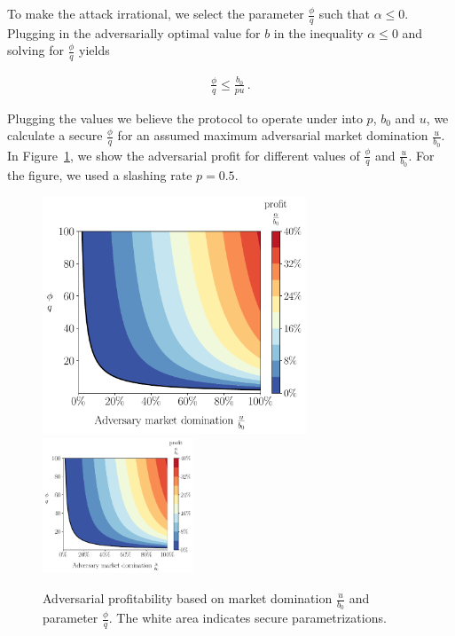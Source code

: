 To make the attack irrational, we select
the parameter $\frac{\phi}{q}$ such that $\alpha \leq 0$.
Plugging in the adversarially optimal value for $b$ in the inequality $\alpha \leq 0$ and solving
for $\frac{\phi}{q}$ yields

\begin{gather*}
  \frac{\phi}{q} \leq \frac{b_0}{p u}\,. \label{eq:phi-choice} \tag{$\ast$}
\end{gather*}

%

Plugging the values we believe the protocol to operate under into
$p$, $b_0$ and $u$, we calculate a secure
$\frac{\phi}{q}$ for an assumed maximum adversarial market domination $\frac{u}{b_0}$.
In Figure~\ref{fig:contour-plotu}, we show the adversarial profit for
different values of $\frac{\phi}{q}$ and $\frac{u}{b_0}$.
For the figure, we used a slashing rate $p = 0.5$.


\begin{figure}[htb]
  \centering
  \iflncs
    \includegraphics[width=0.7\textwidth]{./figures/plotu.pdf}
  \fi
  \ifccs
    \includegraphics[width=0.4\textwidth]{./figures/plotu.pdf}
  \fi
  \caption{Adversarial profitability based on market domination
            $\frac{u}{b_0}$ and parameter $\frac{\phi}{q}$.
            The white area indicates secure parametrizations.}
  \label{fig:contour-plotu}
\end{figure}


